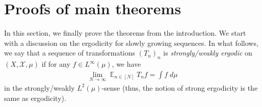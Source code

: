 \documentclass[11pt]{amsart}
\theoremstyle{definition}
\DeclareMathOperator*{\E}{\mathbb{E}}
\newcommand{\CX}{{\mathcal X}}
\newcommand{\1}{{\mathbf{1}}}
\begin{document}
\section{Proofs of main theorems}\label{S: proofs of main theorems}
In this section, we finally prove the theorems from the introduction. We start with a discussion on the ergodicity for slowly growing sequences.  In what follows, we say that a sequence of transformations $(T_n)_n$ is \textit{strongly/weakly ergodic} on $(X, \CX, \mu)$ if for any $f\in L^\infty(\mu)$, we have
\begin{align*}
    \lim_{N\to\infty}\E_{n\in[N]}T_n f= \int f\; d\mu
\end{align*}
in the strongly/weakly $L^{2}(\mu)$-sense (thus, the notion of strong ergodicity is the same as ergodicity). 




 
\end{document}
